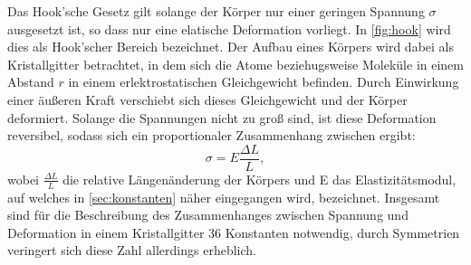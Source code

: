    Das Hook'sche Gesetz gilt solange der Körper nur einer geringen Spannung $\sigma$ ausgesetzt ist, so dass nur eine elatische 
    Deformation vorliegt. In \autoref{fig:hook} wird dies als Hook'scher Bereich bezeichnet. Der Aufbau eines Körpers wird dabei
    als Kristallgitter betrachtet, in dem sich die Atome beziehugsweise Moleküle in einem Abstand $r$ in einem erlektrostatischen
    Gleichgewicht befinden. Durch Einwirkung einer äußeren Kraft verschiebt sich dieses Gleichgewicht und der Körper deformiert.
    Solange die Spannungen nicht zu groß sind, ist diese Deformation reversibel, sodass sich ein proportionaler Zusammenhang zwischen
    ergibt:
    \begin{equation}
    \label{eqn:hook}
        \sigma = E \frac {\Delta L} {L},
    \end{equation}     
    wobei $\frac {\Delta L}{L}$ die relative Längenänderung der Körpers und E das Elastizitätsmodul, auf welches in \autoref{sec:konstanten}
    näher eingegangen wird, bezeichnet.
    Insgesamt sind für die Beschreibung des Zusammenhanges zwischen Spannung und Deformation in einem Kristallgitter 36 Konstanten
    notwendig, durch Symmetrien veringert sich diese Zahl allerdings erheblich. 
